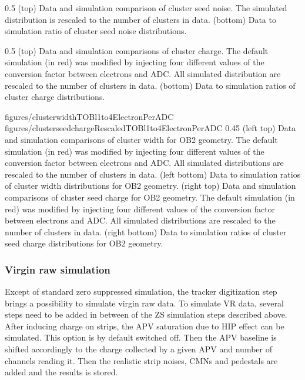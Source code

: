                  {0.5}       %
                 { (top) Data and simulation comparison of cluster seed noise. The simulated distribution is rescaled to the number of clusters in data. (bottom) Data to simulation ratio of cluster seed noise distributions. }


                 {0.5}       %
                 { (top) Data and simulation comparisons of cluster charge. The default simulation (in red) was modified by injecting four different values of the conversion factor between electrons and ADC. All simulated distribution are rescaled to the number of clusters in data. (bottom) Data to simulation ratios of cluster charge distributions. }

                 {figures/clusterwidthTOBl1to4ElectronPerADC}
                 {figures/clusterseedchargeRescaledTOBl1to4ElectronPerADC} %
                 {0.45}       %
                 {(left top) Data and simulation  comparisons of cluster width for OB2 geometry. The default simulation (in red) was modified by injecting four different values of the conversion factor between electrons and ADC. All simulated distributions are rescaled to the number of clusters in data. (left bottom) Data to simulation ratios of cluster width distributions for OB2 geometry. (right top) Data and simulation  comparisons of cluster seed charge for OB2 geometry. The default simulation (in red) was modified by injecting four different values of the conversion factor between electrons and ADC. All simulated distributions are rescaled to the number of clusters in data. (right bottom) Data to simulation ratios of cluster seed charge distributions for OB2 geometry. }

 
\subsubsection{Virgin raw simulation}

Except of standard zero suppressed simulation, the tracker digitization step brings a possibility to simulate virgin raw data. To simulate VR data, several steps need to be added in between of the ZS simulation steps described above. After inducing charge on strips, the APV saturation due to HIP effect can be simulated. This option is by default switched off. Then the APV baseline is shifted accordingly to the charge collected by a given APV and number of channels reading it. Then the realistic strip noises, CMNs and pedestals are added and the results is stored.

